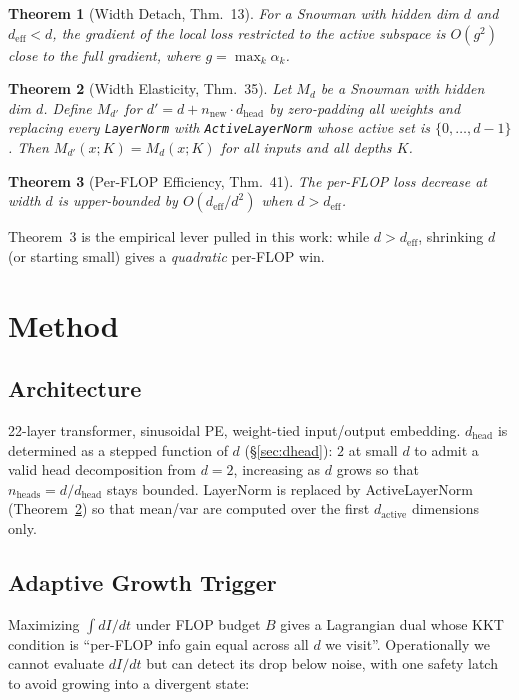 \documentclass{article}
\newtheorem{theorem}{Theorem}
\newcommand{\deff}{d_{\mathrm{eff}}}
\begin{document}
\begin{theorem}[Width Detach, \citealt{paving} Thm.~13]
For a Snowman with hidden dim $d$ and $\deff < d$, the gradient of the local
loss restricted to the active subspace is $O(g^2)$ close to the full
gradient, where $g = \max_k \alpha_k$.
\end{theorem}

\begin{theorem}[Width Elasticity, \citealt{paving} Thm.~35]
\label{thm:elasticity}
Let $M_d$ be a Snowman with hidden dim $d$.  Define $M_{d'}$ for
$d' = d + n_{\text{new}} \cdot d_{\text{head}}$ by zero-padding all weights
and replacing every \texttt{LayerNorm} with \texttt{ActiveLayerNorm} whose
active set is $\{0, \ldots, d-1\}$.  Then $M_{d'}(x; K) = M_d(x; K)$ for all
inputs and all depths $K$.
\end{theorem}

\begin{theorem}[Per-FLOP Efficiency, \citealt{paving} Thm.~41]
The per-FLOP loss decrease at width $d$ is upper-bounded by
$O(\deff / d^2)$ when $d > \deff$.
\end{theorem}

Theorem~3 is the empirical lever pulled in this work: while $d > \deff$,
shrinking $d$ (or starting small) gives a \emph{quadratic} per-FLOP win.

\section{Method}
\label{sec:method}

\subsection{Architecture}
22-layer transformer, sinusoidal PE, weight-tied input/output
embedding.  $d_{\text{head}}$ is determined as a stepped function of
$d$ (\S\ref{sec:dhead}): $2$ at small $d$ to admit a valid head
decomposition from $d{=}2$, increasing as $d$ grows so that
$n_{\text{heads}} = d/d_{\text{head}}$ stays bounded.  LayerNorm is
replaced by ActiveLayerNorm (Theorem~\ref{thm:elasticity}) so that
mean/var are computed over the first $d_{\text{active}}$ dimensions
only.

\subsection{Adaptive Growth Trigger}
\label{sec:trigger}

Maximizing $\int dI/dt$ under FLOP budget $B$ gives a Lagrangian dual whose
KKT condition is ``per-FLOP info gain equal across all $d$ we visit''.
Operationally we cannot evaluate $dI/dt$ but can detect its drop below
noise, with one safety latch to avoid growing into a divergent state:
\end{document}
